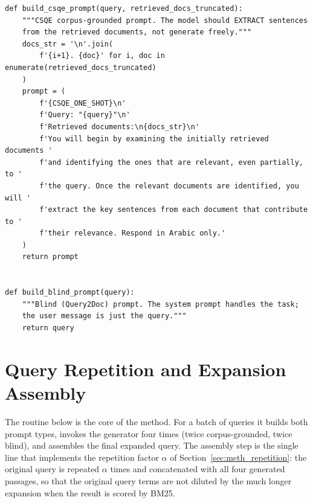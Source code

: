 \begin{codeblock}
\begin{lstlisting}[caption={Prompt construction for the corpus-grounded and blind branches.},label={lst:builders}]
def build_csqe_prompt(query, retrieved_docs_truncated):
    """CSQE corpus-grounded prompt. The model should EXTRACT sentences
    from the retrieved documents, not generate freely."""
    docs_str = '\n'.join(
        f'{i+1}. {doc}' for i, doc in enumerate(retrieved_docs_truncated)
    )
    prompt = (
        f'{CSQE_ONE_SHOT}\n'
        f'Query: "{query}"\n'
        f'Retrieved documents:\n{docs_str}\n'
        f'You will begin by examining the initially retrieved documents '
        f'and identifying the ones that are relevant, even partially, to '
        f'the query. Once the relevant documents are identified, you will '
        f'extract the key sentences from each document that contribute to '
        f'their relevance. Respond in Arabic only.'
    )
    return prompt


def build_blind_prompt(query):
    """Blind (Query2Doc) prompt. The system prompt handles the task;
    the user message is just the query."""
    return query
\end{lstlisting}
\end{codeblock}

\section{Query Repetition and Expansion Assembly}
\label{app:code_assembly}

The routine below is the core of the method. For a batch of queries it builds both
prompt types, invokes the generator four times (twice corpus-grounded, twice
blind), and assembles the final expanded query. The assembly step is the single
line that implements the repetition factor $\alpha$ of
Section~\ref{sec:meth_repetition}: the original query is repeated $\alpha$ times
and concatenated with all four generated passages, so that the original query
terms are not diluted by the much longer expansion when the result is scored by
BM25.

